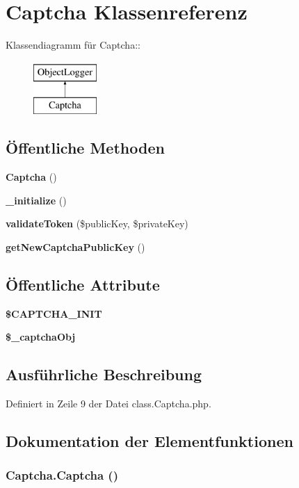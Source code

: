 \section{Captcha Klassenreferenz}
\label{classCaptcha}
Klassendiagramm für Captcha::\begin{figure}[H]
\begin{center}
\leavevmode
\includegraphics[height=2cm]{classCaptcha}
\end{center}
\end{figure}
\subsection*{Öffentliche Methoden}
\begin{CompactItemize}
\item 
{\bf Captcha} ()
\item 
{\bf \_\-initialize} ()
\item 
{\bf validateToken} (\$publicKey, \$privateKey)
\item 
{\bf getNewCaptchaPublicKey} ()
\end{CompactItemize}
\subsection*{Öffentliche Attribute}
\begin{CompactItemize}
\item 
{\bf \$CAPTCHA\_\-INIT}
\item 
{\bf \$\_\-captchaObj}
\end{CompactItemize}


\subsection{Ausführliche Beschreibung}


Definiert in Zeile 9 der Datei class.Captcha.php.

\subsection{Dokumentation der Elementfunktionen}
\subsubsection{\setlength{\rightskip}{0pt plus 5cm}Captcha.Captcha ()}\label{classCaptcha_2db9fbc65381d85da572c91974a44442}




